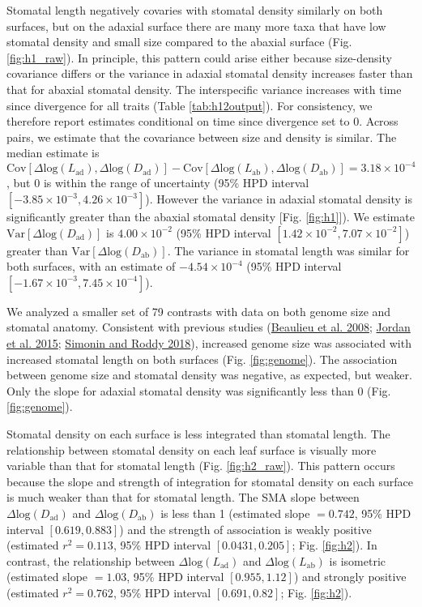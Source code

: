 \documentclass[
  12pt,
]{article}
\begin{document}
Stomatal length negatively covaries with stomatal density similarly on both surfaces, but on the adaxial surface there are many more taxa that have low stomatal density and small size compared to the abaxial surface (Fig. \ref{fig:h1_raw}). In principle, this pattern could arise either because size-density covariance differs or the variance in adaxial stomatal density increases faster than that for abaxial stomatal density. The interspecific variance increases with time since divergence for all traits (Table \ref{tab:h12output}). For consistency, we therefore report estimates conditional on time since divergence set to 0. Across pairs, we estimate that the covariance between size and density is similar. The median estimate is \(\text{Cov}[\Delta \text{log}(L_\text{ad}), \Delta \text{log}(D_\text{ad})] - \text{Cov}[\Delta \text{log}(L_\text{ab}), \Delta \text{log}(D_\text{ab})] = 3.18 \times 10^{-4}\), but 0 is within the range of uncertainty (95\% HPD interval \([-3.85 \times 10^{-3},4.26 \times 10^{-3}]\)). However the variance in adaxial stomatal density is significantly greater than the abaxial stomatal density {[}Fig. \ref{fig:h1}{]}). We estimate \(\text{Var}[\Delta \text{log}(D_\text{ad})]\) is \(4.00 \times 10^{-2}\) (95\% HPD interval \([1.42 \times 10^{-2},7.07 \times 10^{-2}]\)) greater than \(\text{Var}[\Delta \text{log}(D_\text{ab})]\). The variance in stomatal length was similar for both surfaces, with an estimate of \(-4.54 \times 10^{-4}\) (95\% HPD interval \([-1.67 \times 10^{-3},7.45 \times 10^{-4}]\)).

We analyzed a smaller set of 79 contrasts with data on both genome size and stomatal anatomy. Consistent with previous studies (\protect\hyperlink{ref-beaulieu_genome_2008}{Beaulieu et al. 2008}; \protect\hyperlink{ref-jordan_environmental_2015}{Jordan et al. 2015}; \protect\hyperlink{ref-simonin_genome_2018}{Simonin and Roddy 2018}), increased genome size was associated with increased stomatal length on both surfaces (Fig. \ref{fig:genome}). The association between genome size and stomatal density was negative, as expected, but weaker. Only the slope for adaxial stomatal density was significantly less than 0 (Fig. \ref{fig:genome}).

Stomatal density on each surface is less integrated than stomatal length. The relationship between stomatal density on each leaf surface is visually more variable than that for stomatal length (Fig. \ref{fig:h2_raw}). This pattern occurs because the slope and strength of integration for stomatal density on each surface is much weaker than that for stomatal length. The SMA slope between \(\Delta \text{log}(D_\text{ad})\) and \(\Delta \text{log}(D_\text{ab})\) is less than 1 (estimated slope \(= 0.742\), 95\% HPD interval \([0.619,0.883]\)) and the strength of association is weakly positive (estimated \(r^2 = 0.113\), 95\% HPD interval \([0.0431,0.205]\); Fig. \ref{fig:h2}). In contrast, the relationship between \(\Delta \text{log}(L_\text{ad})\) and \(\Delta \text{log}(L_\text{ab})\) is isometric (estimated slope \(= 1.03\), 95\% HPD interval \([0.955,1.12]\)) and strongly positive (estimated \(r^2 = 0.762\), 95\% HPD interval \([0.691,0.82]\); Fig. \ref{fig:h2}).
\end{document}
